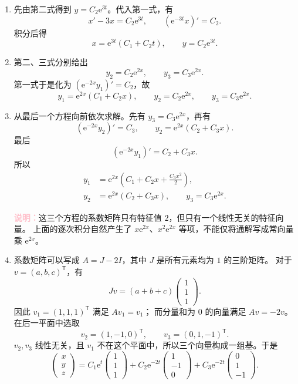 \documentclass[UTF8,a4paper,11pt]{ctexart}
\newcommand{\e}{\mathrm e}
\newcommand{\note}[1]{\par\smallskip\noindent\textcolor{pink}{\bfseries 说明：}#1\par\smallskip}
\begin{document}
\begin{solution}
\begin{enumerate}[label=(\arabic*)]
\item 先由第二式得到 $y=C_2\e^{3t}$。代入第一式，有
\[
x'-3x=C_2\e^{3t},\qquad
(\e^{-3t}x)'=C_2.
\]
积分后得
\[
\boxed{x=\e^{3t}(C_1+C_2t),\qquad y=C_2\e^{3t}.}
\]

\item 第二、三式分别给出
\[
y_2=C_2\e^{2x},\qquad y_3=C_3\e^{2x}.
\]
第一式于是化为 $(\e^{-2x}y_1)'=C_2$，故
\[
\boxed{
y_1=\e^{2x}(C_1+C_2x),\qquad
y_2=C_2\e^{2x},\qquad y_3=C_3\e^{2x}.}
\]

\item 从最后一个方程向前依次求解。先有 $y_3=C_3\e^{2x}$，再有
\[
(\e^{-2x}y_2)'=C_3,\qquad
y_2=\e^{2x}(C_2+C_3x).
\]
最后
\[
(\e^{-2x}y_1)'=C_2+C_3x.
\]
所以
\[
\boxed{
\begin{aligned}
y_1&=\e^{2x}\left(C_1+C_2x+\frac{C_3x^2}{2}\right),\\
y_2&=\e^{2x}(C_2+C_3x),\qquad y_3=C_3\e^{2x}.
\end{aligned}}
\]
\note{这三个方程的系数矩阵只有特征值 $2$，但只有一个线性无关的特征向量。
上面的逐次积分自然产生了 $x\e^{2x}$、$x^2\e^{2x}$ 等项，不能仅将通解写成常向量乘 $\e^{2x}$。}

\item 系数矩阵可以写成 $A=J-2I$，其中 $J$ 是所有元素均为 $1$ 的三阶矩阵。
对于 $v=(a,b,c)^{\mathsf T}$，有
\[
Jv=(a+b+c)\begin{pmatrix}1\\1\\1\end{pmatrix}.
\]
因此 $v_1=(1,1,1)^{\mathsf T}$ 满足 $Av_1=v_1$；
而分量和为 $0$ 的向量满足 $Av=-2v$。在后一平面中选取
\[
v_2=(1,-1,0)^{\mathsf T},\qquad v_3=(0,1,-1)^{\mathsf T}.
\]
$v_2,v_3$ 线性无关，且 $v_1$ 不在这个平面中，所以三个向量构成一组基。于是
\[
\boxed{
\begin{pmatrix}x\\y\\z\end{pmatrix}
=C_1\e^t\begin{pmatrix}1\\1\\1\end{pmatrix}
+C_2\e^{-2t}\begin{pmatrix}1\\-1\\0\end{pmatrix}
+C_3\e^{-2t}\begin{pmatrix}0\\1\\-1\end{pmatrix}.}
\]
\end{enumerate}
\end{solution}
\end{document}
